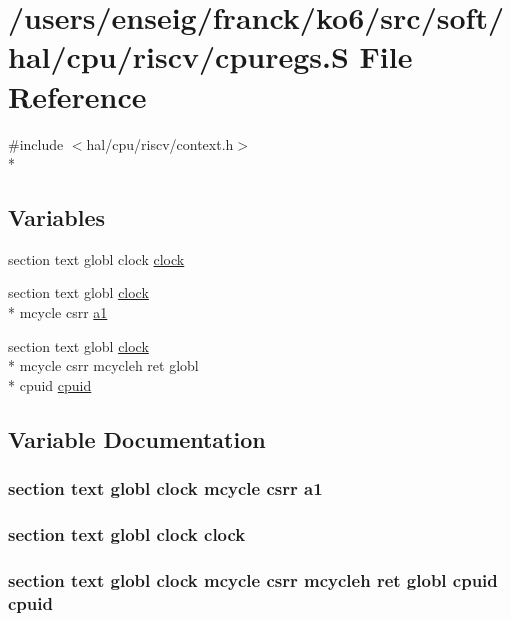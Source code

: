 \hypertarget{riscv_2cpuregs_8S}{\section{/users/enseig/franck/ko6/src/soft/hal/cpu/riscv/cpuregs.S File Reference}
\label{riscv_2cpuregs_8S}
}
{\ttfamily \#include $<$hal/cpu/riscv/context.\-h$>$}\\*
\subsection*{Variables}
\begin{DoxyCompactItemize}
\item 
section text globl clock \hyperlink{riscv_2cpuregs_8S_a2b84e726cb09f8f4cf08897dfd879db2}{clock}
\item 
section text globl \hyperlink{libc_8h_a6f8d66e44afa86c6e39901b0dbbf709e}{clock} \\*
mcycle csrr \hyperlink{riscv_2cpuregs_8S_a973ceaaf8781dbd3bcef96fa989921db}{a1}
\item 
section text globl \hyperlink{libc_8h_a6f8d66e44afa86c6e39901b0dbbf709e}{clock} \\*
mcycle csrr mcycleh ret globl \\*
cpuid \hyperlink{riscv_2cpuregs_8S_af369724bd50c8856d67277ac77ad4419}{cpuid}
\end{DoxyCompactItemize}


\subsection{Variable Documentation}
\hypertarget{riscv_2cpuregs_8S_a973ceaaf8781dbd3bcef96fa989921db}{
\subsubsection[{a1}]{\setlength{\rightskip}{0pt plus 5cm}section text globl {\bf clock} mcycle csrr a1}}\label{riscv_2cpuregs_8S_a973ceaaf8781dbd3bcef96fa989921db}
\hypertarget{riscv_2cpuregs_8S_a2b84e726cb09f8f4cf08897dfd879db2}{
\subsubsection[{clock}]{\setlength{\rightskip}{0pt plus 5cm}section text globl clock clock}}\label{riscv_2cpuregs_8S_a2b84e726cb09f8f4cf08897dfd879db2}
\hypertarget{riscv_2cpuregs_8S_af369724bd50c8856d67277ac77ad4419}{
\subsubsection[{cpuid}]{\setlength{\rightskip}{0pt plus 5cm}section text globl {\bf clock} mcycle csrr mcycleh ret globl cpuid cpuid}}\label{riscv_2cpuregs_8S_af369724bd50c8856d67277ac77ad4419}
